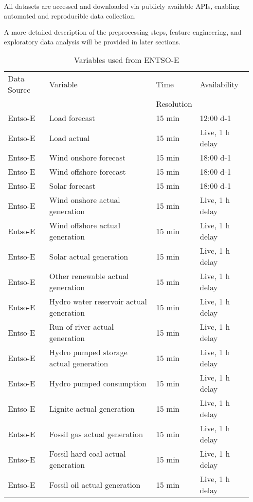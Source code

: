 \documentclass[class=scrbook, crop=false]{standalone}
\begin{document}

All datasets are accessed and downloaded via publicly available APIs, enabling automated and reproducible data collection.

A more detailed description of the preprocessing steps, feature engineering, and exploratory data analysis will be provided in later sections.


\begin{table}[]
\centering
\begin{tabular}{l|l|l|l}
 Data Source & Variable &  Time  & Availability  \\
 &&Resolution&\\\hline
 Entso-E & Load forecast & 15 min  & 12:00 d-1 \\
 Entso-E & Load actual & 15 min  &Live, 1 h delay \\
 Entso-E & Wind onshore forecast & 15 min  & 18:00 d-1\\
 Entso-E & Wind offshore forecast & 15 min & 18:00 d-1 \\
 Entso-E & Solar forecast & 15 min & 18:00 d-1 \\
 Entso-E & Wind onshore actual generation & 15 min  &Live, 1 h delay\\
 Entso-E & Wind offshore actual generation & 15 min &Live, 1 h delay \\
 Entso-E & Solar actual generation & 15 min & Live, 1 h delay \\
 Entso-E & Other renewable actual generation & 15 min &Live, 1 h delay \\
 Entso-E & Hydro water reservoir actual generation & 15 min & Live, 1 h delay \\
 Entso-E & Run of river actual generation & 15 min &Live, 1 h delay \\
 Entso-E & Hydro pumped storage actual generation & 15 min & Live, 1 h delay \\
 Entso-E & Hydro pumped consumption & 15 min & Live, 1 h delay \\
 Entso-E & Lignite actual generation & 15 min & Live, 1 h delay \\
 Entso-E & Fossil gas actual generation & 15 min & Live, 1 h delay \\
 Entso-E & Fossil hard coal actual generation & 15 min & Live, 1 h delay \\
 Entso-E & Fossil oil actual generation & 15 min & Live, 1 h delay \\
  
\end{tabular}
\caption{Variables used from ENTSO-E}
\label{Table::Energy_Data_Entsoe}
\end{table}
\end{document}
